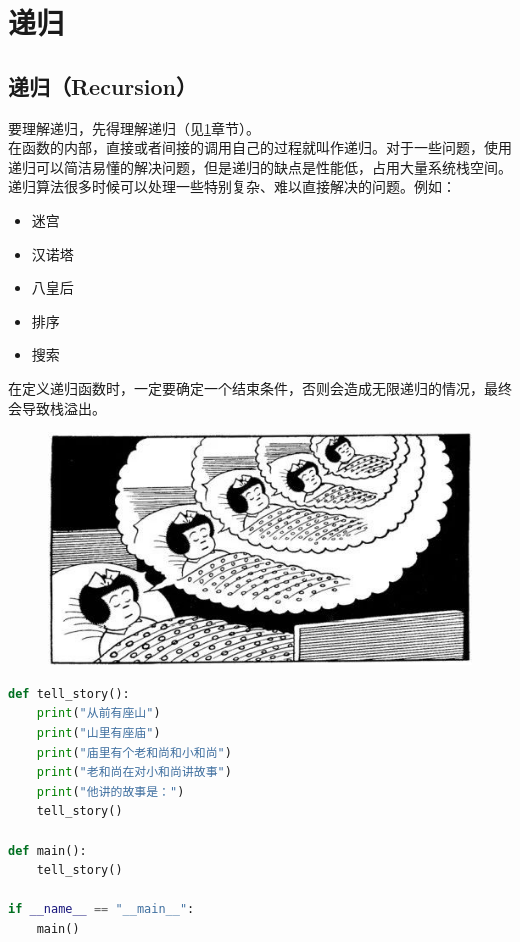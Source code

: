 \newpage

\section{递归} \label{recursive}

\subsection{递归（Recursion）}

要理解递归，先得理解递归（见\ref{recursive}章节）。\\

在函数的内部，直接或者间接的调用自己的过程就叫作递归。对于一些问题，使用递归可以简洁易懂的解决问题，但是递归的缺点是性能低，占用大量系统栈空间。\\

递归算法很多时候可以处理一些特别复杂、难以直接解决的问题。例如：

\begin{itemize}
	\item 迷宫
	\item 汉诺塔
	\item 八皇后
	\item 排序
	\item 搜索
\end{itemize}

在定义递归函数时，一定要确定一个结束条件，否则会造成无限递归的情况，最终会导致栈溢出。

\begin{figure}[H]
	\centering
	\includegraphics[scale=0.7]{img/Chapter5/5-5/1.png}
\end{figure}


\begin{lstlisting}[language=Python]
def tell_story():
	print("从前有座山")
	print("山里有座庙")
	print("庙里有个老和尚和小和尚")
	print("老和尚在对小和尚讲故事")
	print("他讲的故事是：")
	tell_story()

def main():
	tell_story()

if __name__ == "__main__":
	main()
\end{lstlisting}

